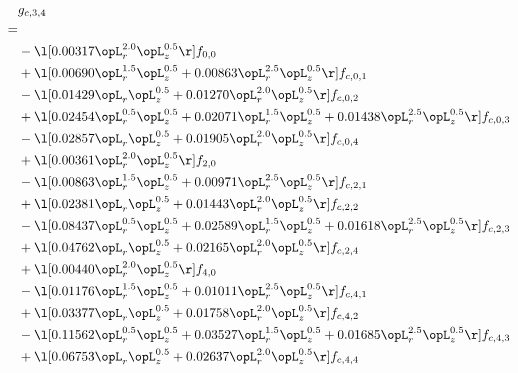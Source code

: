 \begin{alignat}{2} 
\label{eq:g_34_0} 
& g_{c,3,4} \nonumber \\ 
 = \\ 
& - \l[  0.00317 \opL_r^{2.0} \opL_z^{0.5}  \r] f_{0,0} \nonumber \\ 
& + \l[  0.00690 \opL_r^{1.5} \opL_z^{0.5} +  0.00863 \opL_r^{2.5} \opL_z^{0.5}  \r] f_{c,0,1} \nonumber \\ 
& - \l[  0.01429 \opL_r \opL_z^{0.5} +  0.01270 \opL_r^{2.0} \opL_z^{0.5}  \r] f_{c,0,2} \nonumber \\ 
& + \l[  0.02454 \opL_r^{0.5} \opL_z^{0.5} +  0.02071 \opL_r^{1.5} \opL_z^{0.5} +  0.01438 \opL_r^{2.5} \opL_z^{0.5}  \r] f_{c,0,3} \nonumber \\ 
& - \l[  0.02857 \opL_r \opL_z^{0.5} +  0.01905 \opL_r^{2.0} \opL_z^{0.5}  \r] f_{c,0,4} \nonumber \\ 
& + \l[  0.00361 \opL_r^{2.0} \opL_z^{0.5}  \r] f_{2,0} \nonumber \\ 
& - \l[  0.00863 \opL_r^{1.5} \opL_z^{0.5} +  0.00971 \opL_r^{2.5} \opL_z^{0.5}  \r] f_{c,2,1} \nonumber \\ 
& + \l[  0.02381 \opL_r \opL_z^{0.5} +  0.01443 \opL_r^{2.0} \opL_z^{0.5}  \r] f_{c,2,2} \nonumber \\ 
& - \l[  0.08437 \opL_r^{0.5} \opL_z^{0.5} +  0.02589 \opL_r^{1.5} \opL_z^{0.5} +  0.01618 \opL_r^{2.5} \opL_z^{0.5}  \r] f_{c,2,3} \nonumber \\ 
& + \l[  0.04762 \opL_r \opL_z^{0.5} +  0.02165 \opL_r^{2.0} \opL_z^{0.5}  \r] f_{c,2,4} \nonumber \\ 
& + \l[  0.00440 \opL_r^{2.0} \opL_z^{0.5}  \r] f_{4,0} \nonumber \\ 
& - \l[  0.01176 \opL_r^{1.5} \opL_z^{0.5} +  0.01011 \opL_r^{2.5} \opL_z^{0.5}  \r] f_{c,4,1} \nonumber \\ 
& + \l[  0.03377 \opL_r \opL_z^{0.5} +  0.01758 \opL_r^{2.0} \opL_z^{0.5}  \r] f_{c,4,2} \nonumber \\ 
& - \l[  0.11562 \opL_r^{0.5} \opL_z^{0.5} +  0.03527 \opL_r^{1.5} \opL_z^{0.5} +  0.01685 \opL_r^{2.5} \opL_z^{0.5}  \r] f_{c,4,3} \nonumber \\ 
& + \l[  0.06753 \opL_r \opL_z^{0.5} +  0.02637 \opL_r^{2.0} \opL_z^{0.5}  \r] f_{c,4,4} \nonumber \\ 
\end{alignat} 


